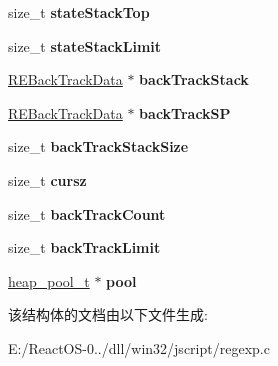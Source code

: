\begin{DoxyCompactItemize}
size\+\_\+t {\bfseries state\+Stack\+Top}
\item 
\mbox{\label{struct_r_e_global_data_ad3e6a4f916236642c792ca92f11fbac0}} 
size\+\_\+t {\bfseries state\+Stack\+Limit}
\item 
\mbox{\label{struct_r_e_global_data_a6f898b94579e5a7b02a4bb1be4ceebfb}} 
\hyperlink{struct_r_e_back_track_data}{R\+E\+Back\+Track\+Data} $\ast$ {\bfseries back\+Track\+Stack}
\item 
\mbox{\label{struct_r_e_global_data_a61a218691bed36d9e3f0c4e3ff946d6a}} 
\hyperlink{struct_r_e_back_track_data}{R\+E\+Back\+Track\+Data} $\ast$ {\bfseries back\+Track\+SP}
\item 
\mbox{\label{struct_r_e_global_data_a322dcea489a3cb18052e60eb094d733e}} 
size\+\_\+t {\bfseries back\+Track\+Stack\+Size}
\item 
\mbox{\label{struct_r_e_global_data_a6905e170dad48e5fb681d1210e046f4d}} 
size\+\_\+t {\bfseries cursz}
\item 
\mbox{\label{struct_r_e_global_data_a7d6e44f8f50b58c1d978a1690fe892fa}} 
size\+\_\+t {\bfseries back\+Track\+Count}
\item 
\mbox{\label{struct_r_e_global_data_a07060283e94bfba45c564924bd66ecd2}} 
size\+\_\+t {\bfseries back\+Track\+Limit}
\item 
\mbox{\label{struct_r_e_global_data_ac6a6345aad83ef986c1b70a0f3b6f4d8}} 
\hyperlink{structheap__pool__t}{heap\+\_\+pool\+\_\+t} $\ast$ {\bfseries pool}
\end{DoxyCompactItemize}


该结构体的文档由以下文件生成\+:\begin{DoxyCompactItemize}
\item 
E\+:/\+React\+O\+S-\/0../dll/win32/jscript/regexp.\+c\end{DoxyCompactItemize}

